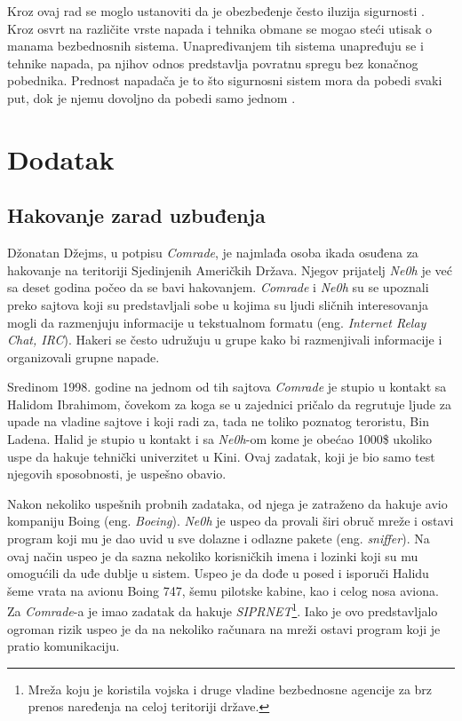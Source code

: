 \documentclass[a4paper]{article}
\begin{document}
Kroz ovaj rad se moglo ustanoviti da je obezbeđenje često iluzija sigurnosti \cite{deception}. Kroz osvrt na različite vrste napada i tehnika obmane se mogao steći utisak o manama bezbednosnih sistema. Unapređivanjem tih sistema unapređuju se i tehnike napada, pa njihov odnos predstavlja povratnu spregu bez konačnog pobednika. 
Prednost napadača je to što sigurnosni sistem mora da pobedi svaki put, dok je njemu dovoljno da pobedi samo jednom \cite{intrusion}.


\appendix
 


\appendix
\section{Dodatak}

\subsection{Hakovanje zarad uzbuđenja}
\label{mladi_hakeri}

Džonatan Džejms, u potpisu \textit{Comrade}, je najmlađa osoba ikada osuđena za hakovanje na teritoriji Sjedinjenih Američkih Država. Njegov prijatelj \textit{Ne0h} je već sa deset godina počeo da se bavi hakovanjem.  \textit{Comrade} i 
\textit{Ne0h} su se upoznali preko sajtova koji su predstavljali sobe u kojima su ljudi sličnih interesovanja mogli da razmenjuju informacije u tekstualnom formatu (eng. \textit{Internet Relay Chat, IRC}). Hakeri se često udružuju u grupe kako bi razmenjivali informacije i organizovali grupne napade.

Sredinom 1998. godine na jednom od tih sajtova \textit{Comrade} je stupio u kontakt sa Halidom Ibrahimom, čovekom za koga se u zajednici pričalo da regrutuje ljude za upade na vladine sajtove i koji radi za, tada ne toliko poznatog teroristu, Bin Ladena. Halid je stupio u kontakt i sa \textit{Ne0h}-om kome je obećao 1000\$ ukoliko uspe da hakuje tehnički univerzitet u Kini. Ovaj zadatak, koji je bio samo test njegovih sposobnosti, je uspešno obavio.

Nakon nekoliko uspešnih probnih zadataka, od njega je zatraženo da hakuje avio kompaniju Boing (eng. \textit{Boeing}). \textit{Ne0h} je uspeo da provali širi obruč mreže i ostavi program koji mu je dao uvid u sve dolazne i odlazne pakete (eng. \textit{sniffer}). Na ovaj način uspeo je da sazna nekoliko korisničkih imena i lozinki koji su mu omogućili da uđe dublje u sistem. Uspeo je da dođe u posed i isporuči Halidu šeme vrata na avionu Boing 747, šemu pilotske kabine, kao i celog nosa aviona. Za \textit{Comrade}-a je imao  zadatak da hakuje \textit{SIPRNET}\footnote{Mreža koju je koristila vojska i druge vladine bezbednosne agencije za brz prenos naređenja na celoj teritoriji države.}. Iako je ovo predstavljalo ogroman rizik uspeo je da na nekoliko računara na mreži ostavi program koji je pratio komunikaciju.
\end{document}
